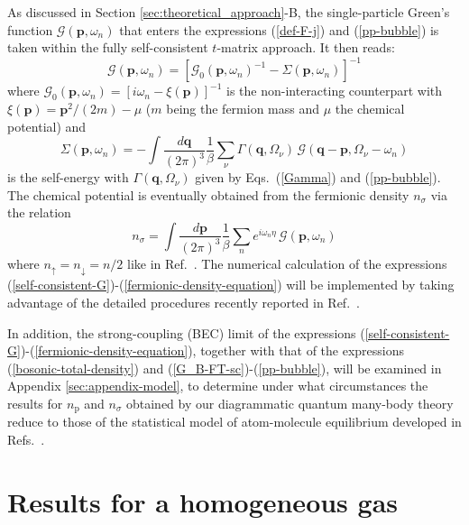 \documentclass[pra,twocolumn,aps,amssymb,showpacs,superscriptaddress]{revtex4-1}
\begin{document}
As discussed in Section \ref{sec:theoretical_approach}-B, the single-particle Green's function $\mathcal{G}(\mathbf{p},\omega_{n})$ that enters the expressions (\ref{def-F-j}) and (\ref{pp-bubble})
is taken within the fully self-consistent $t$-matrix approach.
It then reads:
\begin{equation}
\mathcal{G}(\mathbf{p},\omega_{n}) = \left[ \mathcal{G}_{0}(\mathbf{p},\omega_{n})^{-1} - \Sigma(\mathbf{p},\omega_{n}) \right]^{-1} 
\label{self-consistent-G}
\end{equation}
where $\mathcal{G}_{0}(\mathbf{p},\omega_{n}) = [i \omega_{n} - \xi(\mathbf{p})]^{-1}$ is the non-interacting counterpart with $\xi(\mathbf{p}) = \mathbf{p}^{2}/(2m) - \mu$ ($m$ being the fermion mass and $\mu$ the chemical potential) and 
\begin{equation}
\Sigma(\mathbf{p},\omega_{n}) = - \int \! \frac{d{\mathbf q}}{(2\pi)^{3}} \frac{1}{\beta} \sum_{\nu} \Gamma(\mathbf{q},\Omega_{\nu}) \,\mathcal{G}(\mathbf{q}-\mathbf{p},\Omega_{\nu}-\omega_{n}) 
\label{t-matrix-self-energy}
\end{equation}
is the self-energy with $\Gamma(\mathbf{q},\Omega_{\nu})$ given by Eqs.~(\ref{Gamma}) and (\ref{pp-bubble}).
The chemical potential is eventually obtained from the fermionic density $n_{\sigma}$ via the relation
\begin{equation}
n_{\sigma} = \! \int \! \frac{d\mathbf{p}}{(2 \pi)^{3}} \frac{1}{\beta} \sum_{n} e^{i \omega_{n} \eta} \, \mathcal{G}(\mathbf{p},\omega_{n}) 
\label{fermionic-density-equation}
\end{equation}
where $n_{\uparrow} = n_{\downarrow} = n/2$ like in Ref.~\cite{Ulm-Cam-2019}.
The numerical calculation of the expressions (\ref{self-consistent-G})-(\ref{fermionic-density-equation}) will be implemented by taking advantage of the detailed procedures recently reported
in Ref.~\cite{PPS-2019}.

In addition, the strong-coupling (BEC) limit of the expressions (\ref{self-consistent-G})-(\ref{fermionic-density-equation}), together with that of the expressions (\ref{bosonic-total-density}) and (\ref{G_B-FT-sc})-(\ref{pp-bubble}), will be examined in Appendix \ref{sec:appendix-model}, to determine under what circumstances the results for $n_{\mathrm{p}}$ and $n_{\sigma}$ obtained by our diagrammatic quantum many-body theory reduce to those of the statistical model of atom-molecule equilibrium developed in Refs.~\cite{Chin-Grimm-2004,Eagles-1969}.

\section{Results for a homogeneous gas} 
\label{sec:numerical_results_homogeneous}
\end{document}
